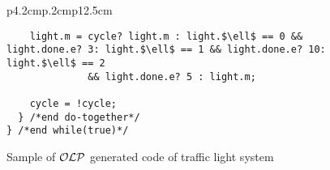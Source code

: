 \begin{figure}
\begin{tabular}{p{4.2cm}p{.2cm}p{12.5cm}}
\begin{lstlisting}
    light.m = cycle? light.m : light.$\ell$ == 0 && light.done.e? 3: light.$\ell$ == 1 && light.done.e? 10: light.$\ell$ == 2 
              && light.done.e? 5 : light.m; 
    
    cycle = !cycle; 
  } /*end do-together*/ 
} /*end while(true)*/
\end{lstlisting}
\end{tabular}
\vspace{-2em}
\caption{Sample of $\mathcal{OLP}$ generated code of traffic light system}
\label{fig:caigtraffic}
\end{figure}
